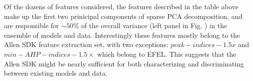   
  



Of the dozens of features considered, the features described in the table above make up the first two prinicipal components of sparse PCA decomposition, and are responsible for $\sim 50\%$ of the overall variance (left panel in Fig. \label{fig:pca_data_points}) in the ensemble of models and data.
Interestingly these features mostly belong to the Allen SDK feature extraction set, with two exceptions: $peak-indices-1.5x$  and $min-AHP-indices-1.5 \times$ which belong to EFEL.
This suggests that the Allen SDK might be nearly sufficient for both characterizing and discriminating between existing models and data.

